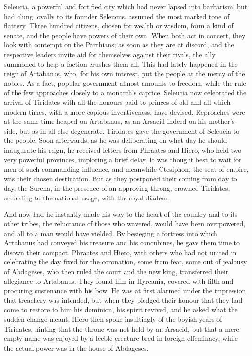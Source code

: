 
Seleucia, a powerful and fortified city which had never lapsed into barbarism, but had clung loyally to its founder Seleucus, assumed the most marked tone of flattery. Three hundred citizens, chosen for wealth or wisdom, form a kind of senate, and the people have powers of their own. When both act in concert, they look with contempt on the Parthians; as soon as they are at discord, and the respective leaders invite aid for themselves against their rivals, the ally summoned to help a faction crushes them all. This had lately happened in the reign of Artabanus, who, for his own interest, put the people at the mercy of the nobles. As a fact, popular government almost amounts to freedom, while the rule of the few approaches closely to a monarch's caprice. Seleucia now celebrated the arrival of Tiridates with all the honours paid to princes of old and all which modern times, with a more copious inventiveness, have devised. Reproaches were at the same time heaped on Artabanus, as an Arsacid indeed on his mother's side, but as in all else degenerate. Tiridates gave the government of Seleucia to the people. Soon afterwards, as he was deliberating on what day he should inaugurate his reign, he received letters from Phraates and Hiero, who held two very powerful provinces, imploring a brief delay. It was thought best to wait for men of such commanding influence, and meanwhile Ctesiphon, the seat of empire, was their chosen destination. But as they postponed their coming from day to day, the Surena, in the presence of an approving throng, crowned Tiridates, according to the national usage, with the royal diadem.


And now had he instantly made his way to the heart of the country and to its other tribes, the reluctance of those who wavered, would have been overpowered, and all to a man would have yielded. By besieging a fortress into which Artabanus had conveyed his treasure and his concubines, he gave them time to disown their compact. Phraates and Hiero, with others who had not united in celebrating the day fixed for the coronation, some from fear, some out of jealousy of Abdageses, who then ruled the court and the new king, transferred their allegiance to Artabanus. They found him in Hyrcania, covered with filth and procuring sustenance with his bow. He was at first alarmed under the impression that treachery was intended, but when they pledged their honour that they had come to restore to him his dominion, his spirit revived, and he asked what the sudden change meant. Hiero then spoke insultingly of the boyish years of Tiridates, hinting that the throne was not held by an Arsacid, but that a mere empty name was enjoyed by a feeble creature bred in foreign effeminacy, while the actual power was in the house of Abdageses.

